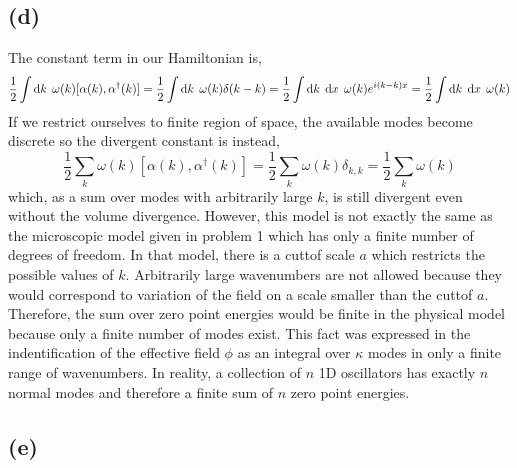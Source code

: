 \documentclass[12pt]{extarticle}
\begin{document}
\subsection*{(d)}
The constant term in our Hamiltonian is,
\[ \frac{1}{2}  \int \mathrm{d}k \: \: \omega(k) [\alpha(k), \alpha^\dagger(k)] = \frac{1}{2}  \int \mathrm{d}k \: \: \omega(k) \delta(k - k) = \frac{1}{2}  \int \mathrm{d}k \: \: \mathrm{d}x \: \: \omega(k) e^{i (k - k) x} = \frac{1}{2}  \int \mathrm{d}k \: \: \mathrm{d}x \: \: \omega(k) \]
If we restrict ourselves to finite region of space, the available modes become discrete so the divergent constant is instead,
\[  \frac{1}{2} \sum_{k} \omega(k) [\alpha(k), \alpha^\dagger(k)] = \frac{1}{2} \sum_{k} \omega(k) \delta_{k,k} = \frac{1}{2} \sum_{k} \omega(k)\]
which, as a sum over modes with arbitrarily large $k$, is still divergent even without the volume divergence. However, this model is not exactly the same as the microscopic model given in problem 1 which has only a finite number of degrees of freedom. In that model, there is a cuttof scale $a$ which restricts the possible values of $k$. Arbitrarily large wavenumbers are not allowed because they would correspond to variation of the field on a scale smaller than the cuttof $a$. Therefore, the sum over zero point energies would be finite in the physical model because only a finite number of modes exist. This fact was expressed in the indentification of the effective field $\phi$ as an integral over $\kappa$ modes in only a finite range of wavenumbers. In reality, a collection of $n$ 1D oscillators has exactly $n$ normal modes and therefore a finite sum of $n$ zero point energies. 

\subsection*{(e)}
\end{document}
